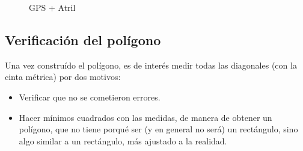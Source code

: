 \documentclass[spanish,12pt,a4paper,titlepage]{report}
\begin{document}
\begin{figure} [h!]
  \centering
  \caption{GPS + Atril}
  \label{fig:rebotes}
\end{figure}

\newpage
\subsection{Verificación del polígono}
\label{sec:verificacion-del-poligono}

Una vez construído el polígono, es de interés medir todas las diagonales (con la cinta métrica) por dos motivos:
\begin{itemize}
\item Verificar que no se cometieron errores.
\item Hacer mínimos cuadrados con las medidas, de manera de obtener un polígono, que no tiene porqué ser (y en general no será) un rectángulo, sino algo similar a un rectángulo, más ajustado a la realidad.
\end{itemize}
\end{document}
